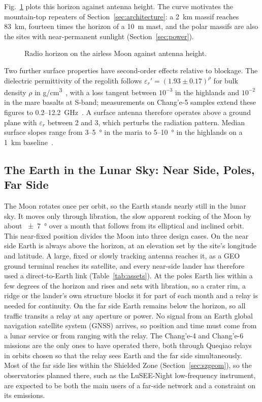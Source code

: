 \documentclass{IEEEoj}
\begin{document}
Fig.~\ref{fig:horizon} plots this horizon against antenna height. The curve motivates the mountain-top repeaters of Section~\ref{sec:architecture}: a \SI{2}{km} massif reaches \SI{83}{km}, fourteen times the horizon of a \SI{10}{m} mast, and the polar massifs are also the sites with near-permanent sunlight (Section~\ref{sec:power}).
\begin{figure}[!t]
\centering

\caption{Radio horizon on the airless Moon against antenna height.}
\label{fig:horizon}
\end{figure}
Two further surface properties have second-order effects relative to blockage. The dielectric permittivity of the regolith follows $\varepsilon_r' = (1.93 \pm 0.17)^{\rho}$ for bulk density $\rho$ in \si{g/cm^3}~\cite{olhoeft_strangway1975}, with a loss tangent between $10^{-3}$ in the highlands and $10^{-2}$ in the mare basalts at S-band; measurements on Chang'e-5 samples extend these figures to \SI{0.2}{}--\SI{12.2}{GHz}~\cite{dong_dielectric_ce5}. A surface antenna therefore operates above a ground plane with $\varepsilon_r$ between 2 and 3, which perturbs the radiation pattern. Median surface slopes range from \SI{3}{}--\SI{5}{\degree} in the maria to \SI{5}{}--\SI{10}{\degree} in the highlands on a \SI{1}{km} baseline~\cite{rosenberg_terrain2011}.


\subsection{The Earth in the Lunar Sky: Near Side, Poles, Far Side}
\label{sec:earthsky}
The Moon rotates once per orbit, so the Earth stands nearly still in the lunar sky. It moves only through libration, the slow apparent rocking of the Moon by about \SI{\pm 7}{\degree} over a month that follows from its elliptical and inclined orbit. This near-fixed position divides the Moon into three design cases. On the near side Earth is always above the horizon, at an elevation set by the site's longitude and latitude. A large, fixed or slowly tracking antenna reaches it, as a GEO ground terminal reaches its satellite, and every near-side lander has therefore used a direct-to-Earth link (Table~\ref{tab:assets}). At the poles Earth lies within a few degrees of the horizon and rises and sets with libration, so a crater rim, a ridge or the lander's own structure blocks it for part of each month and a relay is needed for continuity. On the far side Earth remains below the horizon, so all traffic transits a relay at any aperture or power. No signal from an Earth global navigation satellite system (GNSS) arrives, so position and time must come from a lunar service or from ranging with the relay. The Chang'e-4 and Chang'e-6 missions are the only ones to have operated there, both through Queqiao relays in orbits chosen so that the relay sees Earth and the far side simultaneously. Most of the far side lies within the Shielded Zone (Section~\ref{sec:szgeom}), so the observatories planned there, such as the LuSEE-Night low-frequency instrument, are expected to be both the main users of a far-side network and a constraint on its emissions.
\end{document}
